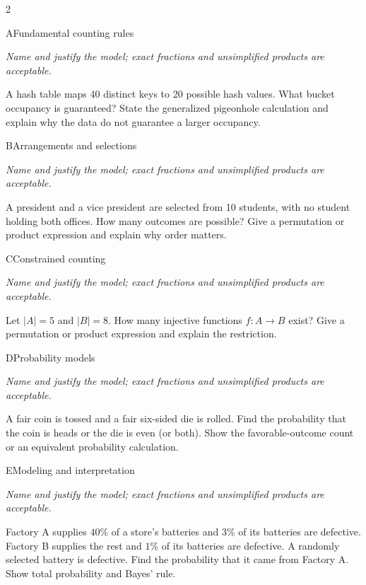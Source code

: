 \documentclass[9pt]{extarticle}
\begin{document}
\CoreWorkArea
\FormBreak
{}
\begin{multicols}{2}
\begin{CoreProblem}{A}{Fundamental counting rules}
{\scriptsize\textit{Name and justify the model; exact fractions and unsimplified products are acceptable.}\par}
A hash table maps 40 distinct keys to 20 possible hash values. What
    bucket occupancy is guaranteed? State the generalized pigeonhole calculation
    and explain why the data do not guarantee a larger occupancy.
\end{CoreProblem}
\begin{CoreProblem}{B}{Arrangements and selections}
{\scriptsize\textit{Name and justify the model; exact fractions and unsimplified products are acceptable.}\par}
A president and a vice president are selected from 10 students, with
    no student holding both offices. How many outcomes are possible? Give a
    permutation or product expression and explain why order matters.
\end{CoreProblem}
\begin{CoreProblem}{C}{Constrained counting}
{\scriptsize\textit{Name and justify the model; exact fractions and unsimplified products are acceptable.}\par}
Let $|A|=5$ and $|B|=8$. How many injective functions $f:A\to B$
    exist? Give a permutation or product expression and explain the restriction.
\end{CoreProblem}
\columnbreak
\begin{CoreProblem}{D}{Probability models}
{\scriptsize\textit{Name and justify the model; exact fractions and unsimplified products are acceptable.}\par}
A fair coin is tossed and a fair six-sided die is rolled. Find the
    probability that the coin is heads or the die is even (or both). Show the
    favorable-outcome count or an equivalent probability calculation.
\end{CoreProblem}
\begin{CoreProblem}{E}{Modeling and interpretation}
{\scriptsize\textit{Name and justify the model; exact fractions and unsimplified products are acceptable.}\par}
Factory A supplies $40\%$ of a store's batteries and $3\%$ of its
    batteries are defective. Factory B supplies the rest and $1\%$ of its
    batteries are defective. A randomly selected battery is defective. Find the
    probability that it came from Factory A. Show total probability and Bayes'
    rule.
\end{CoreProblem}
\end{multicols}
\end{document}
